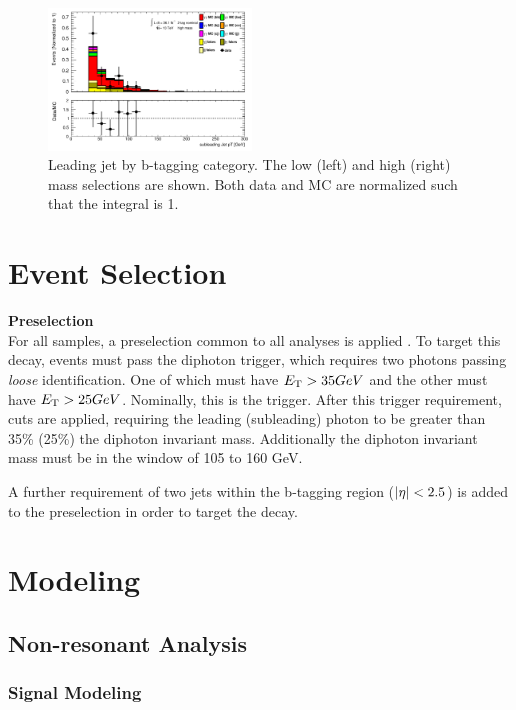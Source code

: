 \begin{figure}[htbp]
  \includegraphics[width=0.48\textwidth]{chapters/chapter5_yybb/images/data_MC_comparison/h_SR_h_2t_nominal_subleadingJet_pt.pdf}
  \caption[Subleading jet \pt.]{Leading jet \pt by b-tagging category. The low (left) and high (right) mass selections are shown. Both data and MC are normalized such that the integral is 1.
  \label{fig:jet_s_pt}}
\end{figure}



\section{Event Selection}
\noindent\textbf{Preselection}\\
\indent For all samples, a preselection common to all \Hgg analyses is applied \cite{hgam-preselection}. To target this decay, events must pass the diphoton trigger, which requires two photons passing \textit{loose} identification. One of which must have $\et > \unit{35}{GeV}$ and the other must have $\et > \unit{25}{GeV}$. Nominally, this is the  trigger. After this trigger requirement, \pt cuts are applied, requiring the leading (subleading) photon \pt to be greater than 35\% (25\%) the diphoton invariant mass. Additionally the diphoton invariant mass must be in the window of 105 to 160 GeV.

A further requirement of two jets within the b-tagging region ($|\eta| <2.5$) is added to the preselection in order to target the \Hbb decay.

\section{Modeling}

\subsection{Non-resonant Analysis}
\subsubsection{Signal Modeling}

